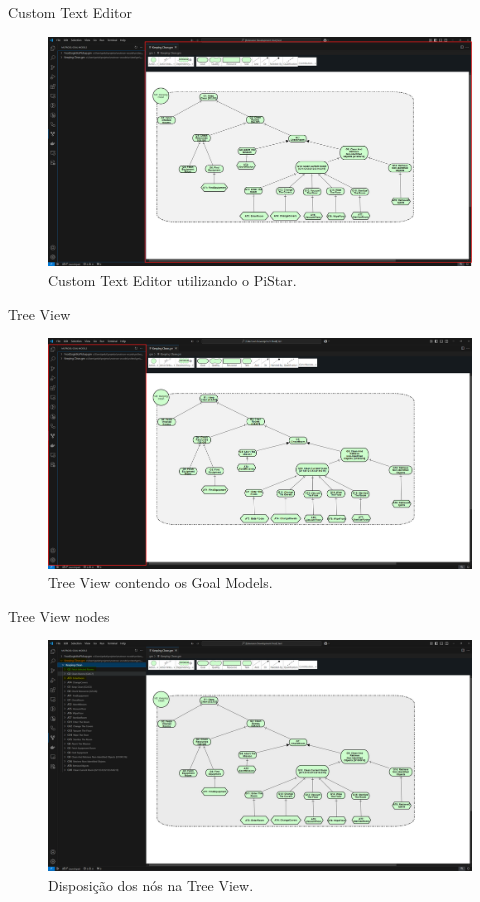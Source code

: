 \documentclass{beamer}
\begin{document}
\begin{frame}{Custom Text Editor}
  \begin{figure}[!h]
    \centering
    \includegraphics[width=1\textwidth]{custom_texteditor.png} 
    \caption{Custom Text Editor utilizando o PiStar.}
  \end{figure}
\end{frame}
\begin{frame}{Tree View}
  \begin{figure}[!h]
    \centering
    \includegraphics[width=1\textwidth]{treeview.png} 
    \caption{Tree View contendo os Goal Models.}
  \end{figure}
\end{frame}
\begin{frame}{Tree View nodes}
  \begin{figure}[!h]
    \centering
    \includegraphics[width=1\textwidth]{Mission in treeview.png} 
    \caption{Disposição dos nós na Tree View.}
  \end{figure}
\end{frame}
\end{document}

